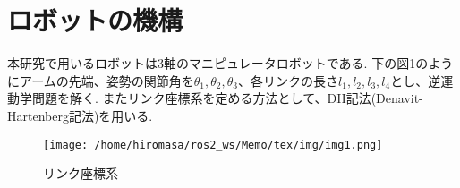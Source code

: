 \documentclass[a4j]{jarticle}			%
\begin{document}
\section{ロボットの機構}
本研究で用いるロボットは3軸のマニピュレータロボットである.
下の図1のようにアームの先端、姿勢の関節角を$\theta_1, \theta_2, \theta_3$、各リンクの長さ$l_1, l_2, l_3, l_4$とし、逆運動学問題を解く.
またリンク座標系を定める方法として、DH記法(Denavit-Hartenberg記法)を用いる.


\begin{figure}[htbp]
\begin{center}
\texttt{[image: /home/hiromasa/ros2\_ws/Memo/tex/img/img1.png]}
\caption{リンク座標系}
\end{center}
\end{figure}
\end{document}
